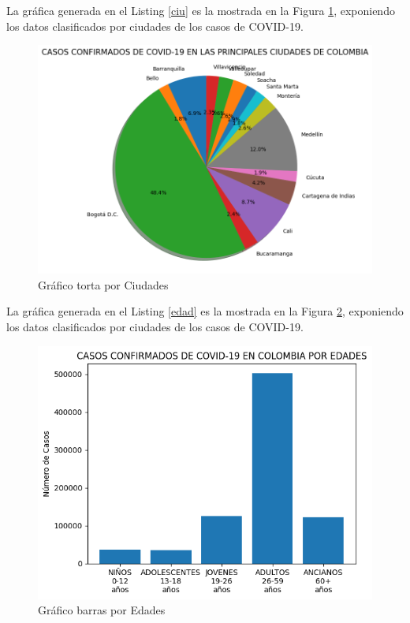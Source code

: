 \documentclass[conference,compsoc,onecolumn]{IEEEtran}
\begin{document}
La gráfica generada en el Listing \ref{ciu} es la mostrada en la Figura \ref{g2}, exponiendo los datos clasificados por ciudades de los casos de COVID-19.


\begin{figure}[H]
    \centering
    \includegraphics[scale=0.4]{Pictures/GraficoTorta_Casos_Ciudad_Covid_Colombia_30-09-20.png}
    \caption{Gráfico torta por Ciudades}
    \label{g2}
\end{figure}

La gráfica generada en el Listing \ref{edad} es la mostrada en la Figura \ref{g3}, exponiendo los datos clasificados por ciudades de los casos de COVID-19.



\begin{figure}[H]
    \centering
    \includegraphics[scale=0.4]{Pictures/GraficoBarras_Edad_Covid_Colombia_30-09-20.png}
    \caption{Gráfico barras por Edades}
    \label{g3}
\end{figure}
\end{document}
